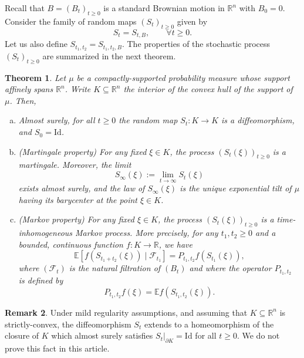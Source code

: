\documentclass[12pt,a4paper]{article}
\newcommand{\E}{\mathbb{E}}
\newcommand{\RR}{\mathbb{R}}
\newcommand{\R}{\mathbb{R}}
\newcommand{\id}{\mathrm{Id}}
\newtheorem{theorem}{Theorem}[section]
\theoremstyle{definition}
\newtheorem{remark}[theorem]{Remark}
\begin{document}
Recall that $B=(B_t)_{t \geq 0}$ is a standard
Brownian motion in $\R^n$ with $B_0 = 0$. Consider the family of random maps $(S_t)_{t \geq 0}$ given by
\[
S_t = S_{t,B}  , \qquad \forall t \geq 0.
\]
Let us also define $S_{t_1,t_2} = S_{t_1,t_2,B}$.
The properties of the stochastic process $(S_t)_{t \geq 0}$  are summarized in the next theorem.
%
\begin{theorem} Let $\mu$ be a compactly-supported probability measure whose support
affinely spans $\RR^n$. Write $ K \subseteq \RR^n $ the interior of the convex hull of the support of $\mu$.
Then,
\begin{enumerate}[(a)]
\item Almost surely, for all $t \geq 0$ the random map $S_t: K \rightarrow K$ is a diffeomorphism, and $S_0 = \id$.
\item (Martingale property) For any fixed $\xi \in K$, the
process $(S_t( \xi ))_{t \geq 0}$ is a martingale. Moreover, the limit 
$$ S_{\infty}(\xi) := \lim_{t\to \infty} S_t (\xi) $$
exists almost surely, and the law of $S_{\infty}(\xi)$ is the unique exponential tilt of $\mu$ having its barycenter at the point $\xi \in K$.
\item (Markov property) For any fixed $\xi\in K$, the process
$(S_t (\xi))_{t \geq 0}$ is a time-inhomogeneous Markov process.
More precisely, for any $t_1,t_2 \geq 0$ and 
a bounded, continuous function $f \colon K \to \R$, we have
\begin{equation}\label{eq_3430}
\E [ f ( S_{t_1+t_2} (\xi) ) \mid \mathcal F_{t_1} ] = P_{t_1,t_2} f ( S_{t_1} (\xi )),
\end{equation}
where $(\mathcal F_t)$ is the natural filtration of $(B_t)$ and where
the operator $P_{t_1,t_2}$ is defined by
$$
P_{t_1,t_2}  f ( \xi ) = \E f( S_{t_1,t_2} ( \xi )) .
$$
\end{enumerate}
\label{prop_1623}
\end{theorem}


\begin{remark} Under mild regularity assumptions, and assuming that $K \subseteq \RR^n$ is strictly-convex, the diffeomorphism $S_t$ extends to a homeomorphism of the closure of $K$ which almost surely satisfies $S_t|_{\partial K} = \id$ for all $t \geq 0$. We do not prove this fact in this article.
\end{remark}
\end{document}
